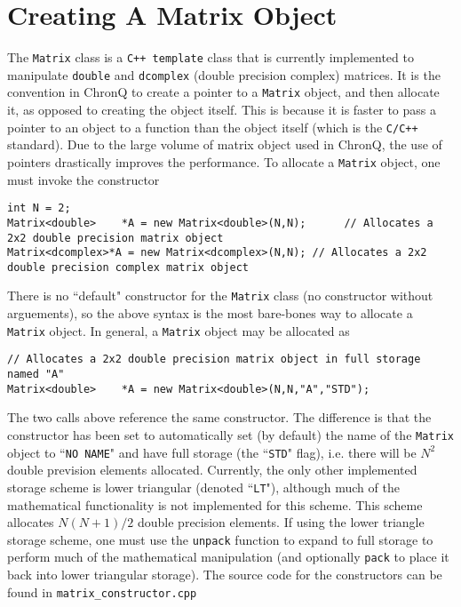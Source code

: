 \documentclass[english,journal=jctcce,manuscript=article,etalmode=truncate,maxauthors=0]{article}
\begin{document}
\section{Creating A Matrix Object}
The \texttt{Matrix} class is a \texttt{C++ template} class that is currently implemented to manipulate \texttt{double} and \texttt{dcomplex} (double precision complex) matrices. It is the convention in ChronQ to create a pointer to a \texttt{Matrix} object, and then allocate it, as opposed to creating the object itself. This is because it is faster to pass a pointer to an object to a function than the object itself (which is the \texttt{C/C++} standard). Due to the large volume of matrix object used in ChronQ, the use of pointers drastically improves the performance. To allocate a \texttt{Matrix} object, one must invoke the constructor
\newpage
\begin{lstlisting}
int N = 2;
Matrix<double>    *A = new Matrix<double>(N,N);      // Allocates a 2x2 double precision matrix object
Matrix<dcomplex>*A = new Matrix<dcomplex>(N,N); // Allocates a 2x2 double precision complex matrix object
\end{lstlisting}
There is no ``default" constructor for the \texttt{Matrix} class (no constructor without arguements), so the above syntax is the most bare-bones way to allocate a \texttt{Matrix} object. In general, a \texttt{Matrix} object may be allocated as
\begin{lstlisting}
// Allocates a 2x2 double precision matrix object in full storage named "A"
Matrix<double>    *A = new Matrix<double>(N,N,"A","STD");
\end{lstlisting}
The two calls above reference the same constructor. The difference is that the constructor has been set to automatically set (by default) the name of the \texttt{Matrix} object to ``\texttt{NO NAME}" and have full storage (the ``\texttt{STD}" flag), i.e. there will be $N^2$ double prevision elements allocated. Currently, the only other implemented storage scheme is lower triangular (denoted ``\texttt{LT}"), although much of the mathematical functionality is not implemented for this scheme. This scheme allocates $N(N+1)/2$ double precision elements. If using the lower triangle storage scheme, one must use the \texttt{unpack} function to expand to full storage to perform much of the mathematical manipulation (and optionally \texttt{pack} to place it back into lower triangular storage). The source code for the constructors can be found in \texttt{matrix\_constructor.cpp}
\end{document}
